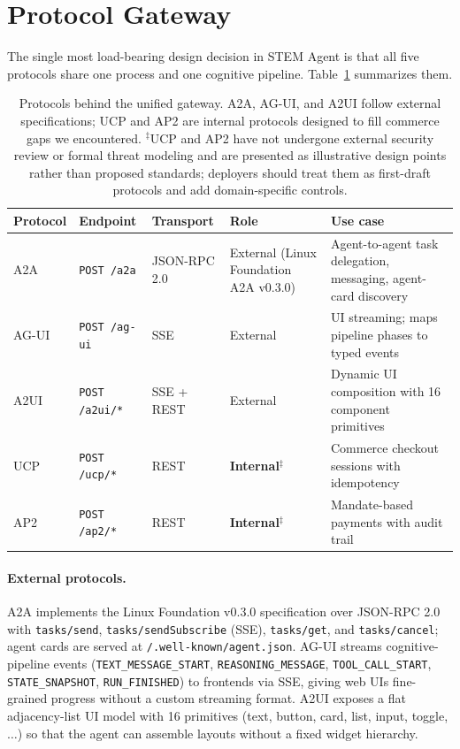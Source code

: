 \documentclass[11pt]{article}
\begin{document}
\section{Protocol Gateway}
\label{sec:protocols}

The single most load-bearing design decision in STEM Agent is that all five protocols share one process and one cognitive pipeline. Table~\ref{tab:protocols} summarizes them.

\begin{table}[t]
  \small
  \centering
  \begin{tabular}{llllp{5.5cm}}
    \toprule
    Protocol & Endpoint & Transport & Role & Use case \\
    \midrule
    A2A  & \texttt{POST /a2a}          & JSON-RPC 2.0 & External (Linux Foundation A2A v0.3.0) & Agent-to-agent task delegation, messaging, agent-card discovery \\
    AG-UI & \texttt{POST /ag-ui}        & SSE           & External             & UI streaming; maps pipeline phases to typed events \\
    A2UI & \texttt{POST /a2ui/*}       & SSE + REST    & External             & Dynamic UI composition with 16 component primitives \\
    UCP  & \texttt{POST /ucp/*}        & REST          & \textbf{Internal}$^\ddagger$ & Commerce checkout sessions with idempotency \\
    AP2  & \texttt{POST /ap2/*}        & REST          & \textbf{Internal}$^\ddagger$ & Mandate-based payments with audit trail \\
    \bottomrule
  \end{tabular}
  \caption{Protocols behind the unified gateway. A2A, AG-UI, and A2UI follow external specifications; UCP and AP2 are internal protocols designed to fill commerce gaps we encountered. $^\ddagger$UCP and AP2 have not undergone external security review or formal threat modeling and are presented as illustrative design points rather than proposed standards; deployers should treat them as first-draft protocols and add domain-specific controls.}
  \label{tab:protocols}
\end{table}

\paragraph{External protocols.} A2A implements the Linux Foundation v0.3.0 specification over JSON-RPC 2.0 with \texttt{tasks/send}, \texttt{tasks/sendSubscribe} (SSE), \texttt{tasks/get}, and \texttt{tasks/cancel}; agent cards are served at \texttt{/.well-known/agent.json}. AG-UI streams cognitive-pipeline events (\texttt{TEXT\_MESSAGE\_START}, \texttt{REASONING\_MESSAGE}, \texttt{TOOL\_CALL\_START}, \texttt{STATE\_SNAPSHOT}, \texttt{RUN\_FINISHED}) to frontends via SSE, giving web UIs fine-grained progress without a custom streaming format. A2UI exposes a flat adjacency-list UI model with 16 primitives (text, button, card, list, input, toggle, $\ldots$) so that the agent can assemble layouts without a fixed widget hierarchy.
\end{document}
